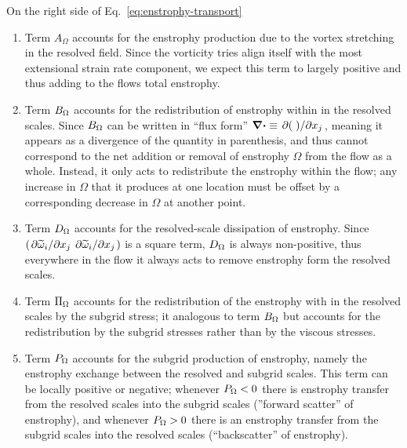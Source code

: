On the right side of Eq.~\ref{eq:enstrophy-transport}
\begin{enumerate}
    \item   
        Term $A_{\Omega}$ accounts for the enstrophy production due to the vortex stretching in the
        resolved field. Since the vorticity tries align itself  with the most extensional strain
        rate component, we expect this term to largely positive and thus adding to the flows total
        enstrophy.
        
    \item
        Term $B_{\Omega}$ accounts for the redistribution of enstrophy within in the resolved scales.
        Since $B_{\Omega}$ can be written in ``flux form'' $\div \equiv \pdv*{(\;)}{x_{j}}$, meaning it
        appears as a divergence of the quantity in parenthesis, and thus cannot correspond to the
        net addition or removal of enstrophy $\Omega$ from the flow as a whole. Instead, it only
        acts to redistribute the enstrophy within the flow; any increase in $\Omega$ that it
        produces at one location must be offset by a corresponding decrease in $\Omega$ at another
        point.   

    \item
        Term $D_{\Omega}$ accounts for the resolved-scale dissipation of enstrophy. Since
        $\left(\pdv*{\widetilde{\omega}_{i}}{x_{j}} \pdv*{\widetilde{\omega}_{i}}{x_{j}}\right)$ is
        a square term, $D_{\Omega}$ is always non-positive, thus everywhere in the flow it always acts
        to remove enstrophy form the resolved scales.
       
    \item
        Term $\Pi_{\Omega}$ accounts for the redistribution of the enstrophy with in the resolved scales
        by the subgrid stress; it analogous to term $B_{\Omega}$ but accounts for the redistribution by
        the subgrid stresses rather than by the viscous stresses.

    \item
        Term $P_{\Omega}$ accounts for the subgrid production of enstrophy, namely the enstrophy
        exchange between the resolved and subgrid scales. This term can be locally positive or
        negative; whenever $P_{\Omega} < 0 $ there is enstrophy transfer from the resolved scales into
        the subgrid scales (''forward scatter'' of enstrophy), and whenever $P_{\Omega} >0$ there is an
        enstrophy transfer from the subgrid scales into the resolved scales (``backscatter'' of
        enstrophy).
        
\end{enumerate}


